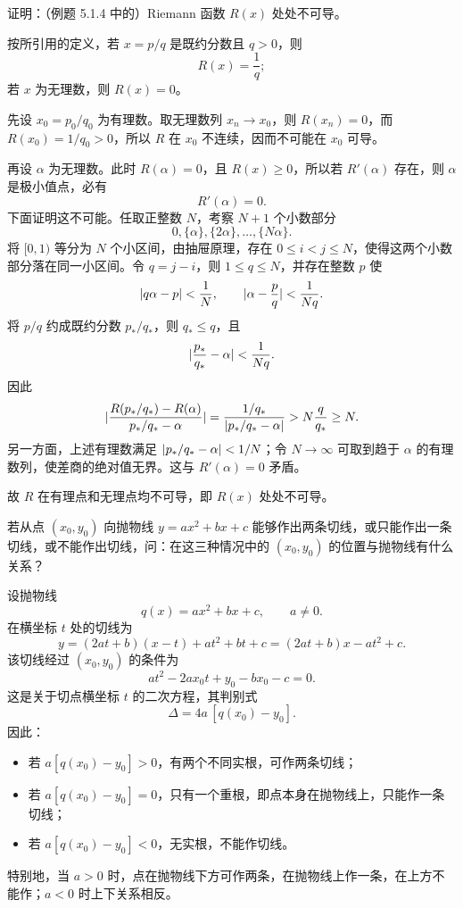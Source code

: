 \begin{xreferenceproblem}[2]
证明：（例题 5.1.4 中的）Riemann 函数 $R(x)$ 处处不可导。
\end{xreferenceproblem}
\begin{xsolution}
按所引用的定义，若 $x=p/q$ 是既约分数且 $q>0$，则
\[
  R(x)=\frac1q;
\]
若 $x$ 为无理数，则 $R(x)=0$。

先设 $x_0=p_0/q_0$ 为有理数。取无理数列 $x_n\to x_0$，则 $R(x_n)=0$，而 $R(x_0)=1/q_0>0$，所以 $R$ 在 $x_0$ 不连续，因而不可能在 $x_0$ 可导。

再设 $\alpha$ 为无理数。此时 $R(\alpha)=0$，且 $R(x)\ge0$，所以若 $R'(\alpha)$ 存在，则 $\alpha$ 是极小值点，必有
\[
  R'(\alpha)=0.
\]
下面证明这不可能。任取正整数 $N$，考察 $N+1$ 个小数部分
\[
  0,\{\alpha\},\{2\alpha\},\ldots,\{N\alpha\}.
\]
将 $[0,1)$ 等分为 $N$ 个小区间，由抽屉原理，存在 $0\le i<j\le N$，使得这两个小数部分落在同一小区间。令 $q=j-i$，则 $1\le q\le N$，并存在整数 $p$ 使
\[
  \lvert q\alpha-p\rvert<\frac1N,
  \qquad
  \lvert\alpha-\frac pq\rvert<\frac1{Nq}.
\]
将 $p/q$ 约成既约分数 $p_*/q_*$，则 $q_*\le q$，且
\[
  \lvert\frac{p_*}{q_*}-\alpha\rvert<\frac1{Nq}.
\]
因此
\[
  \lvert\frac{R(p_*/q_*)-R(\alpha)}{p_*/q_*-\alpha}\rvert
  =\frac{1/q_*}{\lvert p_*/q_*-\alpha\rvert}
  >N\frac q{q_*}\ge N.
\]
另一方面，上述有理数满足 $\lvert p_*/q_*-\alpha\rvert<1/N$；令 $N\to\infty$ 可取到趋于 $\alpha$ 的有理数列，使差商的绝对值无界。这与 $R'(\alpha)=0$ 矛盾。

故 $R$ 在有理点和无理点均不可导，即 $R(x)$ 处处不可导。
\end{xsolution}


\begin{xreferenceproblem}[3]
若从点 $(x_0,y_0)$ 向抛物线 $y=ax^2+bx+c$ 能够作出两条切线，或只能作出一条切线，或不能作出切线，问：在这三种情况中的 $(x_0,y_0)$ 的位置与抛物线有什么关系？
\end{xreferenceproblem}
\begin{xsolution}
设抛物线
\[
  q(x)=ax^2+bx+c,\qquad a\ne0.
\]
在横坐标 $t$ 处的切线为
\[
  y=(2at+b)(x-t)+at^2+bt+c
  =(2at+b)x-at^2+c.
\]
该切线经过 $(x_0,y_0)$ 的条件为
\[
  at^2-2ax_0t+y_0-bx_0-c=0.
\]
这是关于切点横坐标 $t$ 的二次方程，其判别式
\[
  \Delta=4a\,[q(x_0)-y_0].
\]
因此：
\begin{itemize}
  \item 若 $a[q(x_0)-y_0]>0$，有两个不同实根，可作两条切线；
  \item 若 $a[q(x_0)-y_0]=0$，只有一个重根，即点本身在抛物线上，只能作一条切线；
  \item 若 $a[q(x_0)-y_0]<0$，无实根，不能作切线。
\end{itemize}
特别地，当 $a>0$ 时，点在抛物线下方可作两条，在抛物线上作一条，在上方不能作；$a<0$ 时上下关系相反。
\end{xsolution}


